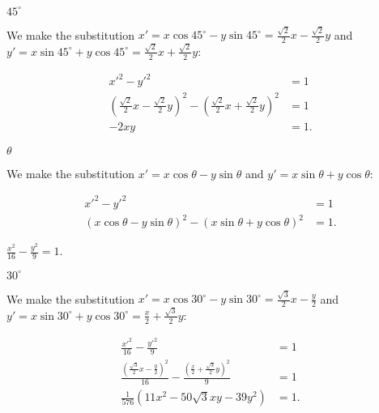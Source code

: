 \documentclass[../gatm_answers.tex]{subfiles}
\begin{document}
\begin{iinner_problem}
\item $45^\circ$
\end{iinner_problem}

\noindent We make the substitution $x'=x \cos 45^\circ - y\sin 45^\circ=\frac{\sqrt{2}}{2}x-\frac{\sqrt{2}}{2}y$ and $y'=x\sin 45^\circ + y\cos 45^\circ=\frac{\sqrt{2}}{2}x+\frac{\sqrt{2}}{2}y$:

\begin{align*}
x'^2-y'^2 &= 1 \\
\left(\frac{\sqrt{2}}{2}x-\frac{\sqrt{2}}{2}y\right)^2 - \left(\frac{\sqrt{2}}{2}x+\frac{\sqrt{2}}{2}y\right)^2 &= 1 \\
-2xy &= 1.
\end{align*}

\begin{iinner_problem}
\item $\theta$
\end{iinner_problem}

\noindent We make the substitution $x'=x \cos \theta - y\sin \theta$ and $y'=x\sin \theta + y\cos \theta$:

\begin{align*}
x'^2-y'^2&=1 \\
(x \cos \theta - y\sin \theta)^2 - (x\sin \theta + y\cos \theta)^2 &= 1.
\end{align*}

\begin{inner_problem}
\item $\frac{x^2}{16}-\frac{y^2}{9}=1.$
\end{inner_problem}

\begin{iinner_problem}[start=1]
\item $30^\circ$
\end{iinner_problem}

\noindent We make the substitution $x'=x \cos 30^\circ - y\sin 30^\circ=\frac{\sqrt{3}}{2}x-\frac{y}{2}$ and $y'=x\sin 30^\circ + y\cos 30^\circ=\frac{x}{2}+\frac{\sqrt{3}}{2}y$:

\begin{align*}
\frac{x'^2}{16}-\frac{y'^2}{9} &= 1 \\
\frac{\left(\frac{\sqrt{3}}{2}x-\frac{y}{2}\right)^2}{16} - \frac{\left(\frac{x}{2}+\frac{\sqrt{3}}{2}y\right)^2}{9} &= 1 \\
\frac{1}{576} (11 x^2 - 50 \sqrt{3} x y - 39 y^2) &= 1.
\end{align*}
\end{document}

